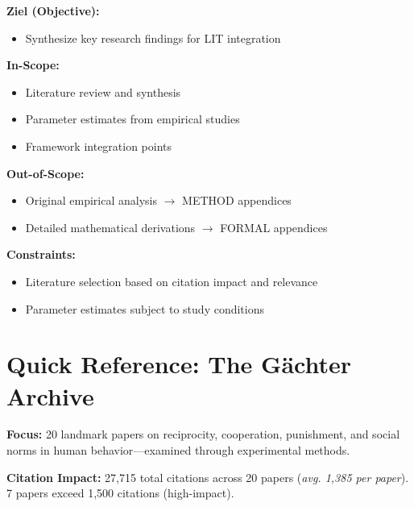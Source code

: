 \documentclass[11pt]{article}
\begin{document}
\begin{tcolorbox}[
    colback=orange!5!white,
    colframe=orange!75!black,
    title={\textbf{Appendix Scope: Ziel / In-Scope / Out-of-Scope / Constraints}},
    fonttitle=\bfseries
]

\textbf{Ziel (Objective):}
\begin{itemize}[nosep]
    \item Synthesize key research findings for LIT integration
\end{itemize}

\textbf{In-Scope:}
\begin{itemize}[nosep]
    \item Literature review and synthesis
    \item Parameter estimates from empirical studies
    \item Framework integration points
\end{itemize}

\textbf{Out-of-Scope:}
\begin{itemize}[nosep]
    \item Original empirical analysis $\rightarrow$ METHOD appendices
    \item Detailed mathematical derivations $\rightarrow$ FORMAL appendices
\end{itemize}

\textbf{Constraints:}
\begin{itemize}[nosep]
    \item Literature selection based on citation impact and relevance
    \item Parameter estimates subject to study conditions
\end{itemize}

\end{tcolorbox}

\section*{Quick Reference: The Gächter Archive}

\textbf{Focus:} 20 landmark papers on reciprocity, cooperation, punishment, and
social norms in human behavior—examined through experimental methods.

\textbf{Citation Impact:} 27,715 total citations across 20 papers
(\textit{avg. 1,385 per paper}). 7 papers exceed 1,500 citations (high-impact).
\end{document}
